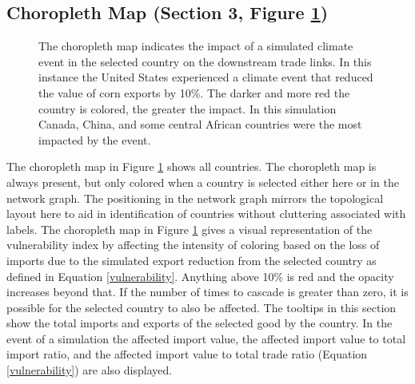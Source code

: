 		\subsection{Choropleth Map (Section 3, Figure \ref{map})}
		\begin{figure}[htb]
			\caption[CHOROPLETH MAP OF A SIMULATED UNITED STATES EXPORT REDUCTION]{The choropleth map indicates the impact of a simulated climate event in the selected country on the downstream trade links. In this instance the United States experienced a climate event that reduced the value of corn exports by 10\%. The darker and more red the country is colored, the greater the impact. In this simulation Canada, China, and some central African countries were the most impacted by the event.}
			\label{map}
		\end{figure}
		The choropleth map in Figure \ref{map} shows all countries. The choropleth map is always present, but only colored when a country is selected either here or in the network graph. The positioning in the network graph mirrors the topological layout here to aid in identification of countries without cluttering associated with labels. The choropleth map in Figure \ref{map} gives a visual representation of the vulnerability index by affecting the intensity of coloring based on the loss of imports due to the simulated export reduction from the selected country as defined in Equation \ref{vulnerability}. Anything above 10\% is red and the opacity increases beyond that. If the number of times to cascade is greater than zero, it is possible for the selected country to also be affected. The tooltips in this section show the total imports and exports of the selected good by the country. In the event of a simulation the affected import value, the affected import value to total import ratio, and the affected import value to total trade ratio (Equation \ref{vulnerability}) are also displayed.\par
